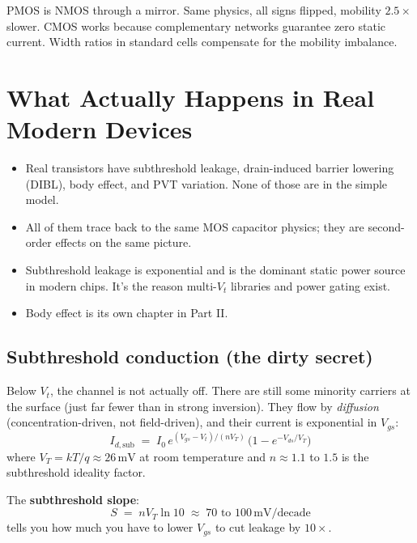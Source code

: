 \documentclass[11pt]{article}
\begin{document}
\begin{checkpoint}
PMOS is NMOS through a mirror. Same physics, all signs flipped, mobility $2.5\times$ slower. CMOS works because complementary networks guarantee zero static current. Width ratios in standard cells compensate for the mobility imbalance.
\end{checkpoint}

\section{What Actually Happens in Real Modern Devices}
\label{sec:subthreshold}

\begin{tldr}
\begin{itemize}[leftmargin=*]
\item Real transistors have subthreshold leakage, drain-induced barrier lowering (DIBL), body effect, and PVT variation. None of those are in the simple model.
\item All of them trace back to the same MOS capacitor physics; they are second-order effects on the same picture.
\item Subthreshold leakage is exponential and is the dominant static power source in modern chips. It's the reason multi-$V_t$ libraries and power gating exist.
\item Body effect is its own chapter in Part II.
\end{itemize}
\end{tldr}

\subsection{Subthreshold conduction (the dirty secret)}

Below $V_t$, the channel is not actually off. There are still some minority carriers at the surface (just far fewer than in strong inversion). They flow by \emph{diffusion} (concentration-driven, not field-driven), and their current is exponential in $V_{gs}$:
\begin{equation}
I_{d,\text{sub}} \;=\; I_0\, e^{(V_{gs} - V_t)/(nV_T)} \,\Big(1 - e^{-V_{ds}/V_T}\Big)
\end{equation}
where $V_T = kT/q \approx 26\,\text{mV}$ at room temperature and $n \approx 1.1$ to $1.5$ is the subthreshold ideality factor.

The \textbf{subthreshold slope}:
\begin{equation}
S \;=\; n V_T \ln 10 \;\approx\; 70 \text{ to } 100\,\text{mV/decade}
\end{equation}
tells you how much you have to lower $V_{gs}$ to cut leakage by $10\times$.
\end{document}
